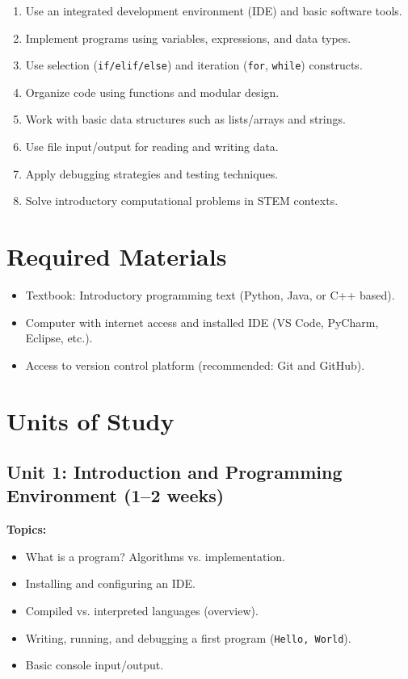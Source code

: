 \documentclass[12pt,oneside]{book}
\begin{document}
\begin{enumerate}
    \item Use an integrated development environment (IDE) and basic software tools.
    \item Implement programs using variables, expressions, and data types.
    \item Use selection (\texttt{if/elif/else}) and iteration (\texttt{for}, \texttt{while}) constructs.
    \item Organize code using functions and modular design.
    \item Work with basic data structures such as lists/arrays and strings.
    \item Use file input/output for reading and writing data.
    \item Apply debugging strategies and testing techniques.
    \item Solve introductory computational problems in STEM contexts.
\end{enumerate}

\section{Required Materials}

\begin{itemize}
    \item Textbook: Introductory programming text (Python, Java, or C++ based).
    \item Computer with internet access and installed IDE (VS Code, PyCharm, Eclipse, etc.).
    \item Access to version control platform (recommended: Git and GitHub).
\end{itemize}

\section{Units of Study}

\subsection{Unit 1: Introduction and Programming Environment (1--2 weeks)}

\textbf{Topics:}
\begin{itemize}
    \item What is a program? Algorithms vs. implementation.
    \item Installing and configuring an IDE.
    \item Compiled vs. interpreted languages (overview).
    \item Writing, running, and debugging a first program (\texttt{Hello, World}).
    \item Basic console input/output.
\end{itemize}
\end{document}
